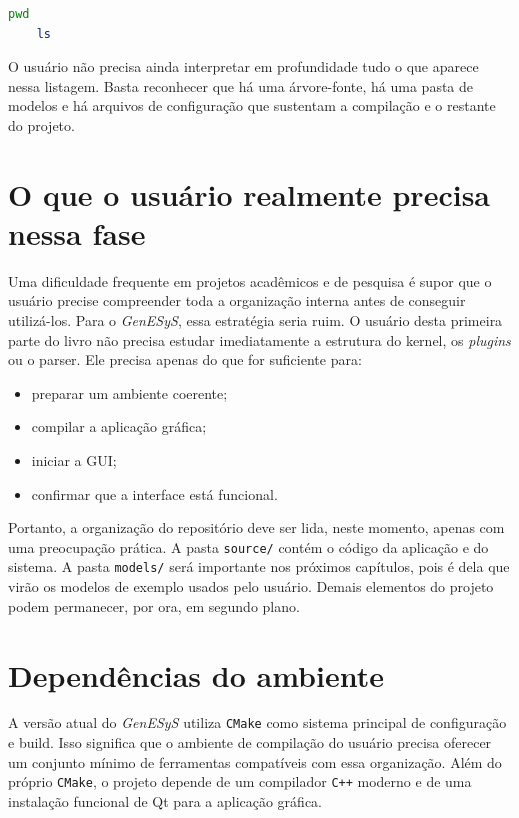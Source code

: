 \begin{lstlisting}[language=bash,caption={Inspeção inicial da raiz do repositório},label={lst:cap2_inspecao_inicial}]
    pwd
    ls
\end{lstlisting}

O usuário não precisa ainda interpretar em profundidade tudo o que aparece nessa listagem. Basta reconhecer que há uma árvore-fonte, há uma pasta de modelos e há arquivos de configuração que sustentam a compilação e o restante do projeto.

\section{O que o usuário realmente precisa nessa fase}
\label{sec:cap2_o_que_usuario_precisa}

Uma dificuldade frequente em projetos acadêmicos e de pesquisa é supor que o usuário precise compreender toda a organização interna antes de conseguir utilizá-los. Para o \textit{GenESyS}, essa estratégia seria ruim. O usuário desta primeira parte do livro não precisa estudar imediatamente a estrutura do kernel, os \textit{plugins} ou o parser. Ele precisa apenas do que for suficiente para:
\begin{itemize}
    \item preparar um ambiente coerente;
    \item compilar a aplicação gráfica;
    \item iniciar a GUI;
    \item confirmar que a interface está funcional.
\end{itemize}

Portanto, a organização do repositório deve ser lida, neste momento, apenas com uma preocupação prática. A pasta \texttt{source/} contém o código da aplicação e do sistema. A pasta \texttt{models/} será importante nos próximos capítulos, pois é dela que virão os modelos de exemplo usados pelo usuário. Demais elementos do projeto podem permanecer, por ora, em segundo plano.

\section{Dependências do ambiente}
\label{sec:cap2_dependencias_ambiente}

A versão atual do \textit{GenESyS} utiliza \texttt{CMake} como sistema principal de configuração e build. Isso significa que o ambiente de compilação do usuário precisa oferecer um conjunto mínimo de ferramentas compatíveis com essa organização. Além do próprio \texttt{CMake}, o projeto depende de um compilador \texttt{C++} moderno e de uma instalação funcional de Qt para a aplicação gráfica.

